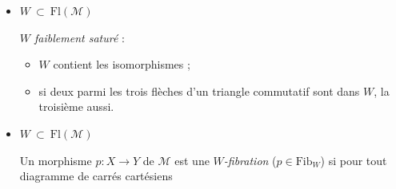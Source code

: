 \documentclass[11pt]{article}
\newcommand{\Fl}{\mathrm{Fl}}
\begin{document}
\begin{itemize}
\item $W \ \subset\ \Fl(\mathcal{M})$

\textit{$W$ faiblement saturé} :
\begin{itemize}
\item[a)] $W$ contient les isomorphismes ;
\item[b)] si deux parmi les trois flèches d'un triangle commutatif sont dans $W$, la troisième aussi.
\end{itemize}

\item $W \ \subset\ \Fl(\mathcal{M})$

Un morphisme $p : X \longrightarrow Y$ de $\mathcal{M}$ est une \textit{$W$-fibration} ($p \in \mathrm{Fib}_W$) si pour tout diagramme de carrés cartésiens
\end{itemize}
\end{document}
